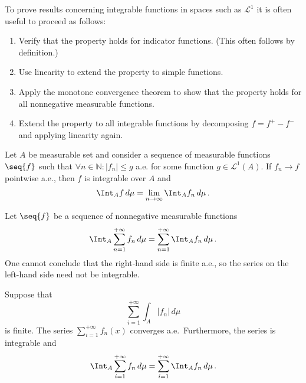     \begin{method}\label{measure:linear_proofs}
        To prove results concerning integrable functions in spaces such as $\mathcal{L}^1$ it is often useful to proceed as follows:
        \begin{enumerate}
            \item Verify that the property holds for indicator functions. (This often follows by definition.)
            \item Use linearity to extend the property to simple functions.
            \item Apply the monotone convergence theorem to show that the property holds for all nonnegative measurable functions.
            \item Extend the property to all integrable functions by decomposing $f=f^+-f^-$ and applying linearity again.
        \end{enumerate}
    \end{method}

    \begin{theorem}\label{measure:dominated_convergence_theorem}
        Let $A$ be measurable set and consider a sequence of measurable functions $\seq{f}$ such that $\forall n\in\mathbb{N}:|f_n|\leq g$ a.e. for some function $g\in\mathcal{L}^1(A)$. If $f_n\longrightarrow f$ pointwise a.e., then $f$ is integrable over $A$ and
        \begin{gather}
            \Int_Af\,d\mu = \lim_{n\rightarrow\infty}\Int_Af_n\,d\mu\,.
        \end{gather}
    \end{theorem}

    \begin{property}
        Let $\seq{f}$ be a sequence of nonnegative measurable functions
        \begin{gather}
            \Int_A\sum_{n=1}^{+\infty}f_n\,d\mu = \sum_{n=1}^{+\infty}\Int_Af_n\,d\mu\,.
        \end{gather}
        One cannot conclude that the right-hand side is finite a.e., so the series on the left-hand side need not be integrable.
    \end{property}

    \begin{theorem}\label{measure:beppo_levi}
        Suppose that \[\sum_{i=1}^{+\infty}\int_A|f_n|\,d\mu\] is finite. The series $\sum_{i=1}^{+\infty}f_n(x)$ converges a.e.~Furthermore, the series is integrable and
        \begin{gather}
            \Int_A\sum_{i=1}^{+\infty}f_n\,d\mu = \sum_{i=1}^{+\infty}\Int_Af_n\,d\mu\,.
        \end{gather}
    \end{theorem}

